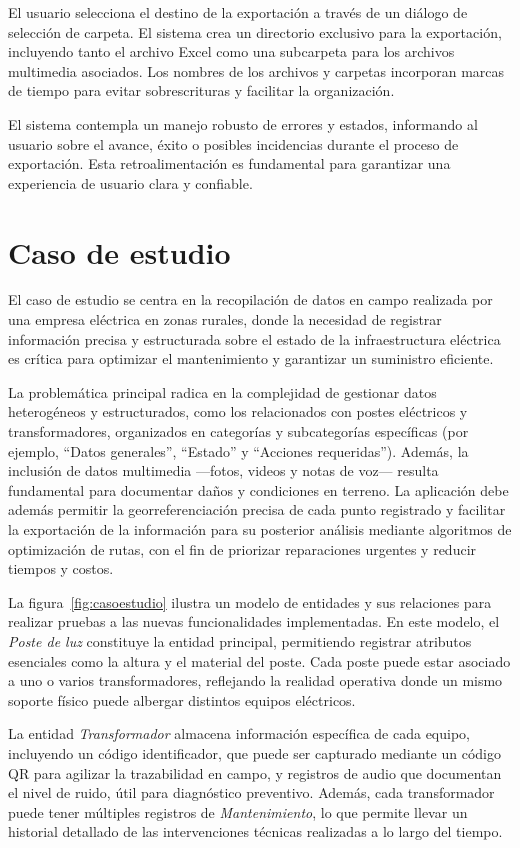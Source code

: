 \documentclass{article}
\begin{document}
El usuario selecciona el destino de la exportación a través de un diálogo de selección de carpeta. El sistema crea un directorio exclusivo para la exportación, incluyendo tanto el archivo Excel como una subcarpeta para los archivos multimedia asociados. Los nombres de los archivos y carpetas incorporan marcas de tiempo para evitar sobrescrituras y facilitar la organización.

El sistema contempla un manejo robusto de errores y estados, informando al usuario sobre el avance, éxito o posibles incidencias durante el proceso de exportación. Esta retroalimentación es fundamental para garantizar una experiencia de usuario clara y confiable.


\section{Caso de estudio}

El caso de estudio se centra en la recopilación de datos en campo realizada por una empresa eléctrica en zonas rurales, donde la necesidad de registrar información precisa y estructurada sobre el estado de la infraestructura eléctrica es crítica para optimizar el mantenimiento y garantizar un suministro eficiente.

La problemática principal radica en la complejidad de gestionar datos heterogéneos y estructurados, como los relacionados con postes eléctricos y transformadores, organizados en categorías y subcategorías específicas (por ejemplo, “Datos generales”, “Estado” y “Acciones requeridas”). Además, la inclusión de datos multimedia —fotos, videos y notas de voz— resulta fundamental para documentar daños y condiciones en terreno. La aplicación debe además permitir la georreferenciación precisa de cada punto registrado y facilitar la exportación de la información para su posterior análisis mediante algoritmos de optimización de rutas, con el fin de priorizar reparaciones urgentes y reducir tiempos y costos.

La figura~\ref{fig:casoestudio} ilustra un modelo de entidades y sus relaciones para realizar pruebas a las nuevas funcionalidades implementadas. En este modelo, el \textit{Poste de luz} constituye la entidad principal, permitiendo registrar atributos esenciales como la altura y el material del poste. Cada poste puede estar asociado a uno o varios transformadores, reflejando la realidad operativa donde un mismo soporte físico puede albergar distintos equipos eléctricos.

La entidad \textit{Transformador} almacena información específica de cada equipo, incluyendo un código identificador, que puede ser capturado mediante un código QR para agilizar la trazabilidad en campo, y registros de audio que documentan el nivel de ruido, útil para diagnóstico preventivo. Además, cada transformador puede tener múltiples registros de \textit{Mantenimiento}, lo que permite llevar un historial detallado de las intervenciones técnicas realizadas a lo largo del tiempo.
\end{document}
